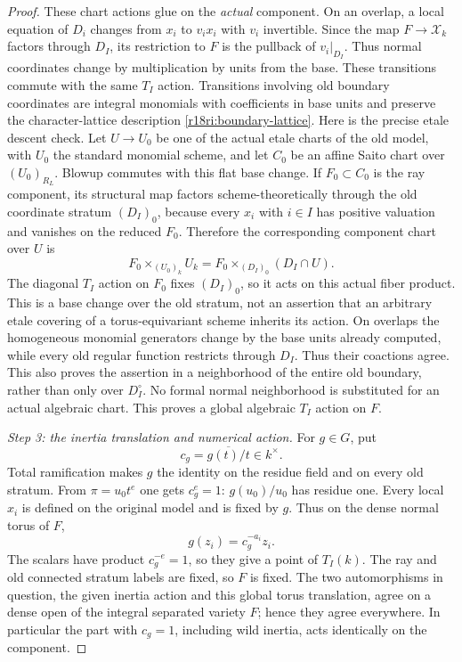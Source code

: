 \begin{proof}
These chart actions glue on the \emph{actual} component.  On an
overlap, a local equation of $D_i$ changes from $x_i$ to $v_i x_i$
with $v_i$ invertible.  Since the map $F\to\mathcal X_k$ factors
through $D_I$, its restriction to $F$ is the pullback of
$v_i|_{D_I}$.  Thus normal coordinates change by multiplication by
units from the base.  These transitions commute with the same
$T_I$ action.  Transitions involving old boundary coordinates are
integral monomials with coefficients in base units and preserve
the character-lattice description \eqref{r18ri:boundary-lattice}.
Here is the precise etale descent check.  Let $U\to U_0$ be one
of the actual etale charts of the old model, with $U_0$ the standard
monomial scheme, and let $C_0$ be an affine Saito chart over
$(U_0)_{R_L}$.  Blowup commutes with this flat base change.
If $F_0\subset C_0$ is the ray component, its structural map
factors scheme-theoretically through the old coordinate stratum
$(D_I)_0$, because every $x_i$ with $i\in I$ has positive valuation
and vanishes on the reduced $F_0$.  Therefore the corresponding
component chart over $U$ is
\[
 F_0\times_{(U_0)_k}U_k
       =F_0\times_{(D_I)_0}(D_I\cap U).
\]
The diagonal $T_I$ action on $F_0$ fixes $(D_I)_0$, so it acts on
this actual fiber product.  This is a base change over the old
stratum, not an assertion that an arbitrary etale covering of a
torus-equivariant scheme inherits its action.  On overlaps the
homogeneous monomial generators change by the base units already
computed, while every old regular function restricts through
$D_I$.  Thus their coactions agree.  This also proves the assertion
in a neighborhood of the entire old boundary, rather than only
over $D_I^\circ$.  No formal normal neighborhood is substituted
for an actual algebraic chart.  This proves a global algebraic
$T_I$ action on $F$.

\emph{Step 3: the inertia translation and numerical action.}
For $g\in G$, put
\[
                              c_g=\overline{g(t)/t}\in k^\times.
\]
Total ramification makes $g$ the identity on the residue field and
on every old stratum.  From $\pi=u_0t^e$ one gets $c_g^e=1$:
$g(u_0)/u_0$ has residue one.  Every local $x_i$ is defined on the
original model and is fixed by $g$.  Thus on the dense normal
torus of $F$,
\[
                         g(z_i)=c_g^{-a_i}z_i.
 \tag{RI18.8}\label{r18ri:translation}
\]
The scalars have product $c_g^{-e}=1$, so they give a point of
$T_I(k)$.  The ray and old connected stratum labels are fixed, so
$F$ is fixed.  The two automorphisms in question, the given inertia
action and this global torus translation, agree on a dense open
of the integral separated variety $F$; hence they agree everywhere.
In particular the part with $c_g=1$, including wild inertia, acts
identically on the component.


\end{proof}
